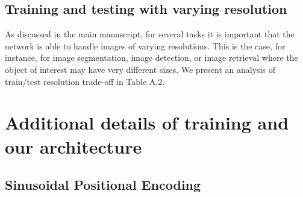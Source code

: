 \subsection{Training and testing with varying resolution}

As discussed in the main manuscript, for several tasks it is important that the network is able to handle images of varying resolutions. This is the case, for instance, for image segmentation, image detection, or image retrieval where the object of interest may have very different sizes. We present an analysis of train/test resolution trade-off in Table A.2.

{\centering 
\begin{table}[h!]
    \vspace*{3pt}
    \centering 
    \label{tab:multi-scale}
    
\end{table}}











\section{Additional details of training and our architecture} 

\subsection{Sinusoidal Positional Encoding}
\label{sec:position_encoding}

